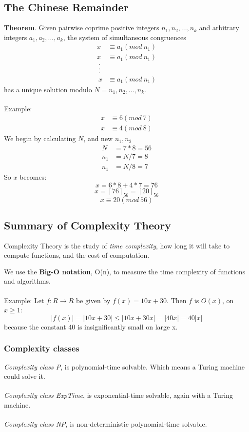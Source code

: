 \documentclass{article}
\begin{document}
	\subsection*{The Chinese Remainder}
	\textbf{Theorem}. Given pairwise coprime positive integers $n_1,n_2,...,n_k$ and arbitrary integers $a_1,a_2,...,a_k$, the system of simultaneous congruences
	\[
	\begin{split}
	x &\equiv a_1 (mod \ n_1) \\
	x &\equiv a_1 (mod \ n_1) \\
	\ . &\\
	\ . &\\
	\ . &\\
	\ x &\equiv a_1 (mod \ n_1)
	\end{split}
	\]
	has a unique solution modulo $N = n_1,n_2,...,n_k$.
	\\\\
	Example:
	\[
	\begin{split}
	x &\equiv 6 (mod \ 7) \\
	x &\equiv 4 (mod \ 8) 
	\end{split}
	\]
	We begin by calculating $N$, and new $n_1,n_2$
	\[
	\begin{split}
	N & = 7*8 = 56 \\
	n_1 &=N/7 = 8 \\
	n_1 &=N/8 = 7 
	\end{split}
	\]
	So $x$ becomes:
	$$
	x=6*8+4*7 = 76 
	$$
	$$
	x=[76]_{56}=[20]_{56}
	$$
	$$
	x \equiv 20 (mod \ 56)
	$$
	
	\subsection*{Summary of Complexity Theory}
	Complexity Theory is the study of \textit{time complexity}, how long it will take to compute functions, and the cost of computation.
	
	We use the \textbf{Big-O notation}, O(n), to measure the time complexity of functions and algorithms. 
	\\\\
	Example: Let $f : R \rightarrow R$ be given by $f(x) = 10x +30$.
	Then $f$ is $O(x)$, on $x\geq 1$:
	$$
	|f(x)| = |10x +30| \leq |10x +30x| = |40x| = 40|x|
	$$
	because the constant 40 is insignificantly small on large x.
	
	\subsubsection*{Complexity classes}
	\textit{Complexity class P}, is polynomial-time solvable. Which means a Turing machine could solve it.
	\\\\
	\textit{Complexity class ExpTime}, is exponential-time solvable, again with a Turing machine.
	\\\\
	\textit{Complexity class NP}, is non-deterministic polynomial-time solvable.
	
	
\end{document}
